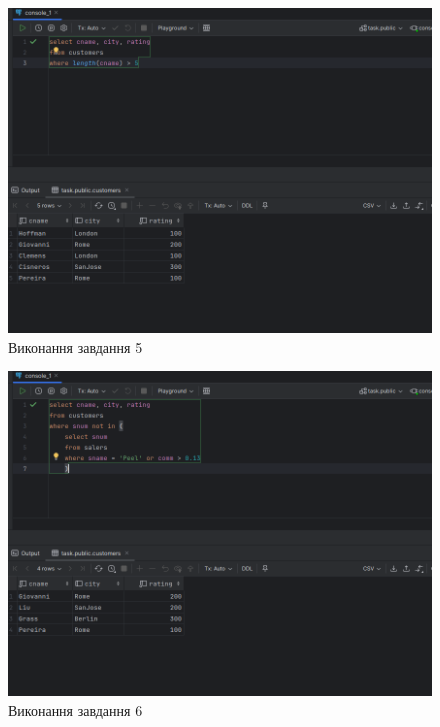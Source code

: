 \documentclass[14pt]{extreport}
\begin{document}
\begin{normalsize}
	\begin{figure}[H]
		\centering
		\includegraphics[scale=0.45]{5}
		\caption{Виконання завдання 5}
	\end{figure}
	
	\begin{figure}[H]
		\centering
		\includegraphics[scale=0.45]{6}
		\caption{Виконання завдання 6}
	\end{figure}
	

\end{normalsize}
\end{document}

